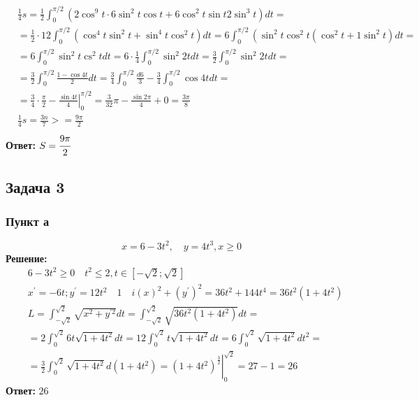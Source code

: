 $$
\begin{aligned}
& \frac{1}{4} s=\frac{1}{2} \int_0^{\pi / 2}\left(2 \cos ^9 t \cdot 6 \sin ^2 t \cos t+6 \cos ^2 t \sin t 2 \sin ^3 t\right) d t= \\
& =\frac{1}{2} \cdot 12 \int_0^{\pi / 2}\left(\cos ^4 t \sin ^2 t+\sin ^4 t \cos ^2 t\right) d t=6 \int_0^{\pi / 2}\left(\sin ^2 t \cos ^2 t\left(\cos ^2 t+1 \sin ^2 t\right) d t=\right. \\
& =6 \int_0^{\pi / 2} \sin ^2 t \operatorname{cs}^2 t d t=6 \cdot \frac{1}{4} \int_0^{\pi / 2} \sin ^2 2 t d t=\frac{3}{2} \int_0^{\pi / 2} \sin ^2 2 t d t= \\
& =\frac{3}{2} \int_0^{\pi / 2} \frac{1-\cos 4 t}{2} d t=\frac{3}{4} \int_0^{\pi / 2} \frac{d 6}{3}-\frac{3}{4} \int_0^{\pi / 2} \cos 4 t d t= \\
& =\frac{3}{4} \cdot \frac{\pi}{2}-\left.\frac{\sin 4 t}{4}\right|_0 ^{\pi / 2}=\frac{3}{32} \pi-\frac{\sin 2 \pi}{4}+0=\frac{3 \pi}{8} \\
& \frac{1}{4} s=\frac{3 n}{7}>=\frac{9 \pi}{2} \\
&
\end{aligned}
$$
\textbf{Ответ:} $S = \cfrac{9\pi}{2}$
\newpage
\subsection*{Задача 3}
\subsubsection*{Пункт а}
$$
x=6-3 t^2, \quad y=4 t^3, x \geqslant 0
$$
\textbf{Решение:} 
$$
\begin{aligned}
& 6-3 t^2 \geq 0 \quad t^2 \leq 2, t \in[-\sqrt{2} ; \sqrt{2}] \\
& x^{\prime}=-6 t ; y^{\prime}=12 t^2 \quad 1 \quad i(x)^2+\left(y^{\prime}\right)^2=36 t^2+144 t^4=36 t^2\left(1+4 t^2\right) \\
& L=\int_{-\sqrt{2}}^{\sqrt{2}} \sqrt{x^2+y^{\prime 2}} d t=\int_{-\sqrt{2}}^{\sqrt{2}} \sqrt{36 t^2\left(1+4 t^2\right)} d t= \\
& =2 \int_0^{\sqrt{2}} 6 t \sqrt{1+4 t^2} d t=12 \int_0^{\sqrt{2}} t \sqrt{1+4 t^2} d t=6 \int_0^{\sqrt{2}} \sqrt{1+4 t^2} d t^2= \\
& =\frac{3}{2} \int_0^{\sqrt{2}} \sqrt{1+4 t^2} d\left(1+4 t^2\right)=\left.\left(1+4 t^2\right)^{\frac{3}{2}}\right|_0 ^{\sqrt{2}}=27-1=26
\end{aligned}
$$
\textbf{Ответ:} $26$
